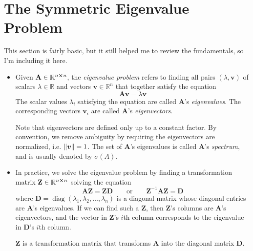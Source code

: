 \documentclass[11pt, a4paper]{article}
\newcommand{\eqtext}[1]{\qquad \text{#1} \qquad}
\newcommand{\mat}[1]{\mathbf{#1}}
\renewcommand{\vec}[1]{\bm{#1}}
\newcommand{\diag}{\operatorname{diag}}
\begin{document}
\section{The Symmetric Eigenvalue Problem}
This section is fairly basic, but it still helped me to review the fundamentals, so I'm including it here.
\begin{itemize}
	\item Given $ \mat{A} \in \mathbb{R}^{n \cross n} $, the \textit{eigenvalue problem} refers to finding all pairs $ (\lambda, \vec{v}) $ of scalars $ \lambda \in \mathbb{R} $ and vectors $ \vec{v} \in \mathbb{R}^{n} $ that together satisfy the equation
	\begin{equation*}
		\mat{A} \vec{v} = \lambda \vec{v}
	\end{equation*}
	The scalar values $ \lambda_{i} $ satisfying the equation are called $ \mat{A} $'s \textit{eigenvalues}. The corresponding vectors $ \vec{v}_{i} $ are called $ \mat{A} $'s \textit{eigenvectors}. 
	
	Note that eigenvectors are defined only up to a constant factor. By convention, we remove ambiguity by requiring the eigenvectors are normalized, i.e. $ \norm{\vec{v}} = 1 $. The set of $ \mat{A} $'s eigenvalues is called $ \mat{A} $'s \textit{spectrum}, and is usually denoted by $ \sigma(A) $.
	
	\item In practice, we solve the eigenvalue problem by finding a transformation matrix $ \mat{Z} \in \mathbb{R}^{n \cross n} $ solving the equation
	\begin{equation*}
		\mat{A} \mat{Z} = \mat{Z} \mat{D} \eqtext{or} \mat{Z}^{-1}\mat{A}\mat{Z} = \mat{D}
	\end{equation*}
	where $ \mat{D} = \diag(\lambda_{1}, \lambda_{2}, \ldots, \lambda_{n}) $ is a diagonal matrix whose diagonal entries are $ \mat{A} $'s eigenvalues. If we can find such a $ \mat{Z} $, then $ \mat{Z} $'s columns are $ \mat{A} $'s eigenvectors, and the vector in $ \mat{Z} $'s $ i $th column corresponds to the eigenvalue in $ \mat{D} $'s $ i $th column. 
	
	$ \mat{Z} $ is a transformation matrix that transforms $ \mat{A} $ into the diagonal matrix $ \mat{D} $. 
	

\end{itemize}
\end{document}
